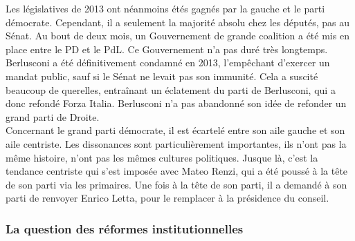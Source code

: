\documentclass[10pt, a4paper, openany]{book}
\begin{document}
Les législatives de 2013 ont néanmoins étés gagnés par la gauche et le parti démocrate. Cependant, il a seulement la majorité absolu chez les députés, pas au Sénat. Au bout de deux mois, un Gouvernement de grande coalition a été mis en place entre le PD et le PdL. Ce Gouvernement n'a pas duré très longtemps. \\
Berlusconi a été définitivement condamné en 2013, l'empêchant d'exercer un mandat public, sauf si le Sénat ne levait pas son immunité. Cela a suscité beaucoup de querelles, entraînant un éclatement du parti de Berlusconi, qui a donc refondé Forza Italia. Berlusconi n'a pas abandonné son idée de refonder un grand parti de Droite. \\
Concernant le grand parti démocrate, il est écartelé entre son aile gauche et son aile centriste. Les dissonances sont particulièrement importantes, ils n'ont pas la même histoire, n'ont pas les mêmes cultures politiques. Jusque là, c'est la tendance centriste qui s'est imposée avec Mateo Renzi, qui a été poussé à la tête de son parti via les primaires. Une fois à la tête de son parti, il a demandé à son parti de renvoyer Enrico Letta, pour le remplacer à la présidence du conseil. 

\subsubsection{La question des réformes institutionnelles}
\end{document}
